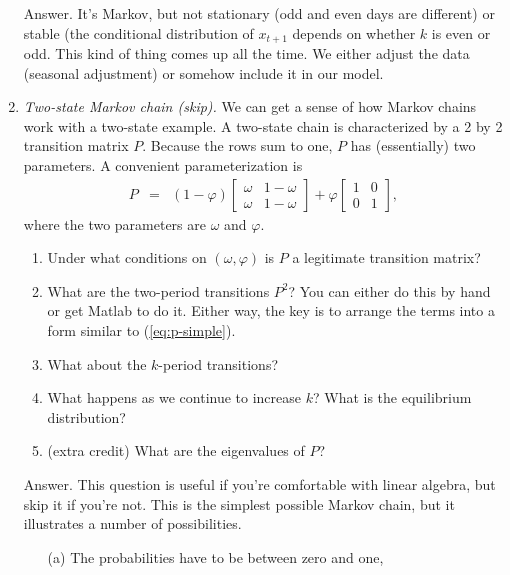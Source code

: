 \documentclass[11pt]{article}
\begin{document}
\begin{enumerate}
Answer.  It's Markov, but not stationary (odd and even days are different)
or stable (the conditional distribution of $x_{t+1}$ depends
on whether $k$ is even or odd.
This kind of thing comes up all the time.
We either adjust the data (seasonal adjustment) or somehow
include it in our model.

\item {\it Two-state Markov chain (skip).\/}
We can get a sense of how Markov chains work with a two-state example.
A two-state chain is characterized by a 2 by 2 transition matrix $P$.
Because the rows sum to one, $P$ has (essentially) two parameters.
A convenient parameterization is
\begin{eqnarray}
    P &=& (1-\varphi)
        \left[
        \begin{array}{cc}
        \omega & 1-\omega \\ \omega & 1-\omega
        \end{array}
        \right]
        + \varphi
        \left[
        \begin{array}{cc}
        1  & 0  \\  0  & 1
        \end{array}
        \right] ,
        \label{eq:p-simple}
\end{eqnarray}
where the two parameters are $\omega$ and $\varphi$.
%
\begin{enumerate}
\item Under what conditions on $(\omega, \varphi)$ is $P$ a legitimate
transition matrix?
\item What are the two-period transitions $P^2$?
You can either do this by hand or get Matlab to do it.  Either way,
the key is to arrange the terms into a form similar to (\ref{eq:p-simple}).
\item What about the $k$-period transitions?
\item What happens as we continue to increase $k$?
What is the equilibrium distribution?
\item (extra credit) What are the eigenvalues of $P$?
\end{enumerate}
%
Answer.
This question is useful if you're comfortable with linear algebra,
but skip it if you're not.
This is the simplest possible Markov chain,
but it illustrates a number of possibilities.
\begin{enumerate}
\item [(a)] The probabilities have to be between zero and one,

\end{enumerate}
\end{enumerate}
\end{document}

